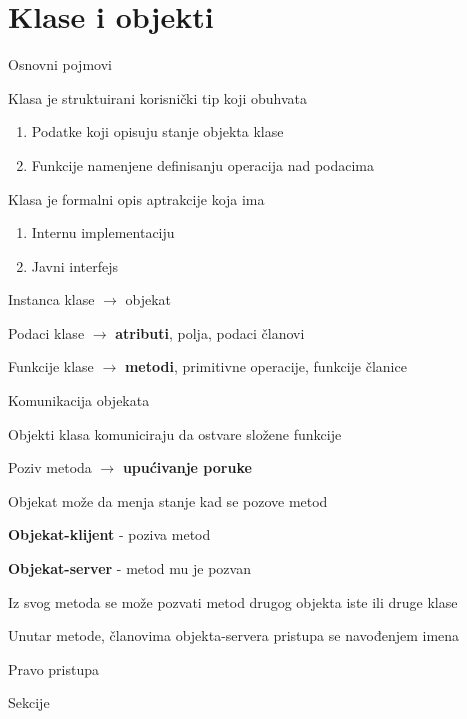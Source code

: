 \documentclass{article}
\newenvironment{xitemize}{%
    
    \itemize
    \larger
}{%
    \enditemize
}
\let\olditemize\itemize
\let\endolditemize\enditemize
\renewenvironment{itemize}{%
    \smaller
    \olditemize
}{%
    \endolditemize
}
\begin{document}
\section{Klase i objekti}
\begin{xitemize}
\item Osnovni pojmovi
\begin{itemize}
    \item Klasa je struktuirani korisnički tip koji obuhvata
    \begin{enumerate}
        \item Podatke koji opisuju stanje objekta klase
        \item Funkcije namenjene definisanju operacija nad podacima
    \end{enumerate}
    \item Klasa je formalni opis aptrakcije koja ima
    \begin{enumerate}
        \item Internu implementaciju
        \item Javni interfejs
    \end{enumerate}
    \item Instanca klase $\rightarrow$ objekat
    \item Podaci klase $\rightarrow$ \textbf{atributi}, polja, podaci članovi
    \item Funkcije klase $\rightarrow$ \textbf{metodi}, primitivne operacije, funkcije članice
\end{itemize}
\item Komunikacija objekata
\begin{itemize}
    \item Objekti klasa komuniciraju da ostvare složene funkcije
    \item Poziv metoda $\rightarrow$ \textbf{upućivanje poruke}
    \item Objekat može da menja stanje kad se pozove metod
    \item \textbf{Objekat-klijent} - poziva metod
    \item \textbf{Objekat-server} - metod mu je pozvan
    \item Iz svog metoda se može pozvati metod drugog objekta iste ili druge klase
    \item Unutar metode, članovima objekta-servera pristupa se navođenjem imena
\end{itemize}
\item Pravo pristupa
\begin{itemize}
    \item Sekcije

\end{itemize}
\end{xitemize}
\end{document}
